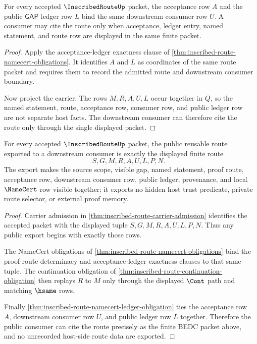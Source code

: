 \begin{theorem}
\label{thm:inscribed-route-namecert-ledger-obligation}
For every accepted $\InscribedRouteUp$ packet, the acceptance row $A$ and the public $\mathsf{GAP}$ ledger row $L$ bind the same downstream consumer row $U$. A consumer may cite the route only when acceptance, ledger entry, named statement, and route row are displayed in the same finite packet.
\end{theorem}
\begin{proof}
Apply the acceptance-ledger exactness clause of \autoref{thm:inscribed-route-namecert-obligations}. It identifies $A$ and $L$ as coordinates of the same route packet and requires them to record the admitted route and downstream consumer boundary.

Now project the carrier. The rows $M,R,A,U,L$ occur together in $Q$, so the named statement, route, acceptance row, consumer row, and public ledger row are not separate host facts. The downstream consumer can therefore cite the route only through the single displayed packet.
\end{proof}

\begin{theorem}
\label{thm:inscribed-route-public-export}
For every accepted $\InscribedRouteUp$ packet, the public reusable route exported to a downstream consumer is exactly the displayed finite route
$$
S,G,M,R,A,U,L,P,N.
$$
The export makes the source scope, visible gap, named statement, proof route, acceptance row, downstream consumer row, public ledger, provenance, and local $\NameCert$ row visible together; it exports no hidden host trust predicate, private route selector, or external proof memory.
\end{theorem}
\begin{proof}
Carrier admission in \autoref{thm:inscribed-route-carrier-admission} identifies the accepted packet with the displayed tuple $S,G,M,R,A,U,L,P,N$. Thus any public export begins with exactly those rows.

The NameCert obligations of \autoref{thm:inscribed-route-namecert-obligations} bind the proof-route determinacy and acceptance-ledger exactness clauses to that same tuple. The continuation obligation of \autoref{thm:inscribed-route-continuation-obligation} then replays $R$ to $M$ only through the displayed $\Cont$ path and matching $\hsame$ rows.

Finally \autoref{thm:inscribed-route-namecert-ledger-obligation} ties the acceptance row $A$, downstream consumer row $U$, and public ledger row $L$ together. Therefore the public consumer can cite the route precisely as the finite BEDC packet above, and no unrecorded host-side route data are exported.
\end{proof}

